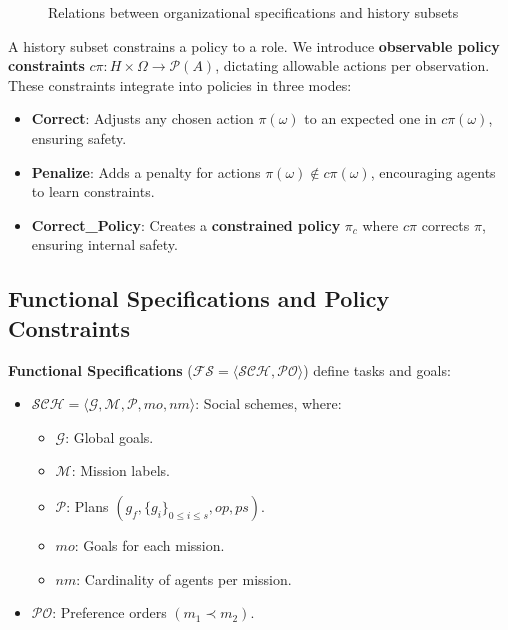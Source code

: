 \documentclass[conference]{IEEEtran}
\begin{document}
\begin{figure}[h!]
    \centering
    
    \caption{Relations between organizational specifications and history subsets}
    \label{fig:PRAHOM_osm_rels}
\end{figure}

A history subset constrains a policy to a role. We introduce \textbf{observable policy constraints} $c\pi: H \times \Omega \rightarrow \mathcal{P}(A)$, dictating allowable actions per observation. These constraints integrate into policies in three modes:
\begin{itemize}
    \item \textbf{Correct}: Adjusts any chosen action $\pi(\omega)$ to an expected one in $c\pi(\omega)$, ensuring safety.
    \item \textbf{Penalize}: Adds a penalty for actions $\pi(\omega) \notin c\pi(\omega)$, encouraging agents to learn constraints.
    \item \textbf{Correct\_Policy}: Creates a \textbf{constrained policy} $\pi_c$ where $c\pi$ corrects $\pi$, ensuring internal safety.
\end{itemize}

\subsection{Functional Specifications and Policy Constraints}

\textbf{Functional Specifications} ($\mathcal{FS} = \langle \mathcal{SCH}, \mathcal{PO} \rangle$) define tasks and goals:
\begin{itemize}
    \item $\mathcal{SCH} = \langle \mathcal{G}, \mathcal{M}, \mathcal{P}, mo, nm \rangle$: Social schemes, where:
    \begin{itemize}
        \item $\mathcal{G}$: Global goals.
        \item $\mathcal{M}$: Mission labels.
        \item $\mathcal{P}$: Plans $(g_f, \{g_i\}_{0 \leq i \leq s}, op, ps)$.
        \item $mo$: Goals for each mission.
        \item $nm$: Cardinality of agents per mission.
    \end{itemize}
    \item $\mathcal{PO}$: Preference orders $(m_1 \prec m_2)$.
\end{itemize}
\end{document}
